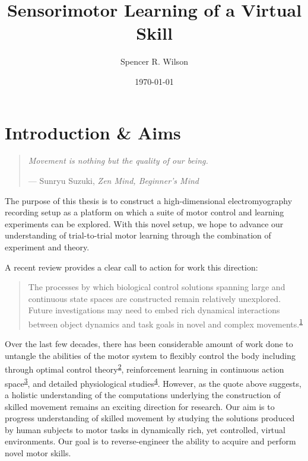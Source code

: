 \documentclass[
  a4paper,
]{article}
\title{Sensorimotor Learning of a Virtual Skill}
\author{Spencer R. Wilson}
\date{\today}
\begin{document}
\maketitle

\hypertarget{sec:intro}{%
\section{Introduction \& Aims}\label{sec:intro}}

\begin{quote}
\emph{Movement is nothing but the quality of our being.}

--- Sunryu Suzuki, \emph{Zen Mind, Beginner's Mind}
\end{quote}

The purpose of this thesis is to construct a high-dimensional
electromyography recording setup as a platform on which a suite of motor
control and learning experiments can be explored. With this novel setup,
we hope to advance our understanding of trial-to-trial motor learning
through the combination of experiment and theory.

A recent review provides a clear call to action for work this direction:

\begin{quote}
The processes by which biological control solutions spanning large and
continuous state spaces are constructed remain relatively unexplored.
Future investigations may need to embed rich dynamical interactions
between object dynamics and task goals in novel and complex
movements.\textsuperscript{\protect\hyperlink{ref-McNamee2019}{1}}
\end{quote}

Over the last few decades, there has been considerable amount of work
done to untangle the abilities of the motor system to flexibly control
the body including through optimal control
theory\textsuperscript{\protect\hyperlink{ref-Todorov2004}{2}},
reinforcement learning in continuous action
space\textsuperscript{\protect\hyperlink{ref-koberReinforcementLearningRobotics2013}{3}},
and detailed physiological
studies\textsuperscript{\protect\hyperlink{ref-sauerbreiCorticalPatternGeneration2019}{4}}.
However, as the quote above suggests, a holistic understanding of the
computations underlying the construction of skilled movement remains an
exciting direction for research. Our aim is to progress understanding of
skilled movement by studying the solutions produced by human subjects to
motor tasks in dynamically rich, yet controlled, virtual environments.
Our goal is to reverse-engineer the ability to acquire and perform novel
motor skills.
\end{document}
